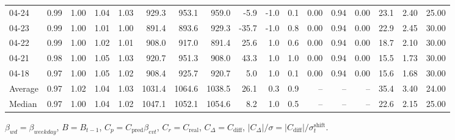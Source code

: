 \begin{threeparttable}
{\begin{tabular}{lrrrrrrrrrrrrrrrr}
  04-24 &         0.99 &           1.00 &          1.04 &          1.03 &  929.3 &  953.1 &  959.0 &       -5.9 &                     -1.0 &                 0.1 &       0.00 &      0.94 &           0.00 &             23.1 &            2.40 &                  25.00 \\
  04-23 &         0.99 &           1.00 &          1.01 &          1.00 &  891.4 &  893.6 &  929.3 &      -35.7 &                     -1.0 &                 0.8 &       0.00 &      0.94 &           0.00 &             22.9 &            2.45 &                  30.00 \\
  04-22 &         0.99 &           1.00 &          1.02 &          1.01 &  908.0 &  917.0 &  891.4 &       25.6 &                      1.0 &                 0.6 &       0.00 &      0.94 &           0.00 &             18.7 &            2.10 &                  30.00 \\
  04-21 &         0.98 &           1.00 &          1.05 &          1.03 &  920.7 &  951.3 &  908.0 &       43.3 &                      1.0 &                 1.0 &       0.00 &      0.94 &           0.00 &             15.5 &            1.73 &                  30.00 \\
  04-18 &         0.97 &           1.00 &          1.05 &          1.02 &  908.4 &  925.7 &  920.7 &        5.0 &                      1.0 &                 0.1 &       0.00 &      0.94 &           0.00 &             15.6 &            1.68 &                  30.00 \\
Average &         0.97 &           1.02 &          1.04 &          1.03 & 1031.4 & 1064.6 & 1038.5 &       26.1 &                      0.3 &                 0.9 &         -- &        -- &             -- &             35.4 &            3.40 &                  24.00 \\
 Median &         0.97 &           1.00 &          1.04 &          1.02 & 1047.1 & 1052.1 & 1054.6 &        8.2 &                      1.0 &                 0.5 &         -- &        -- &             -- &             22.6 &            2.15 &                  25.00 \\
\bottomrule
\end{tabular}
}
\begin{tablenotes}\footnotesize
\item $\beta_{wd}=\beta_{weekday}$, $B=B_{t-1}$,
$C_p=C_{\text{pred}}\beta_{evt}$, $C_r=C_{\text{real}}$,
$C_\Delta=C_{\text{diff}}$, $|C_\Delta|/\sigma=|C_{\text{diff}}|/\sigma_t^{\text{shift}}$.
\end{tablenotes}
\end{threeparttable}
\endgroup

